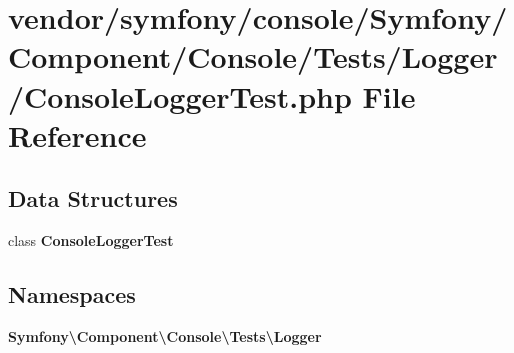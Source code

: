 \section{vendor/symfony/console/\+Symfony/\+Component/\+Console/\+Tests/\+Logger/\+Console\+Logger\+Test.php File Reference}
\label{_console_logger_test_8php}
\subsection*{Data Structures}
\begin{DoxyCompactItemize}
\item 
class {\bf Console\+Logger\+Test}
\end{DoxyCompactItemize}
\subsection*{Namespaces}
\begin{DoxyCompactItemize}
\item 
 {\bf Symfony\textbackslash{}\+Component\textbackslash{}\+Console\textbackslash{}\+Tests\textbackslash{}\+Logger}
\end{DoxyCompactItemize}

